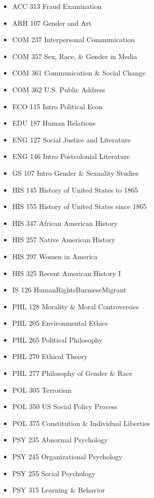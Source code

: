 \documentclass[
  letterpaper,
]{scrbook}
\providecommand{\tightlist}{%
  \setlength{\itemsep}{0pt}\setlength{\parskip}{0pt}}
\begin{document}
\begin{enumerate}
  \begin{itemize}
  \tightlist
  \item
    ACC 313 Fraud Examination
  \item
    ARH 107 Gender and Art
  \item
    COM 237 Interpersonal Communication
  \item
    COM 357 Sex, Race, \& Gender in Media
  \item
    COM 361 Communication \& Social Change
  \item
    COM 362 U.S. Public Address
  \item
    ECO 115 Intro Political Econ
  \item
    EDU 187 Human Relations
  \item
    ENG 127 Social Justice and Literature
  \item
    ENG 146 Intro Postcolonial Literature
  \item
    GS 107 Intro Gender \& Sexuality Studies
  \item
    HIS 145 History of United States to 1865
  \item
    HIS 155 History of United States since 1865
  \item
    HIS 347 African American History
  \item
    HIS 257 Native American History
  \item
    HIS 297 Women in America
  \item
    HIS 325 Recent American History I
  \item
    IS 126 HumanRightsBurmeseMigrant
  \item
    PHL 128 Morality \& Moral Controversies
  \item
    PHL 205 Environmental Ethics
  \item
    PHL 265 Political Philosophy
  \item
    PHL 270 Ethical Theory
  \item
    PHL 277 Philosophy of Gender \& Race
  \item
    POL 305 Terrorism
  \item
    POL 350 US Social Policy Process
  \item
    POL 375 Constitution \& Individual Liberties
  \item
    PSY 235 Abnormal Psychology
  \item
    PSY 245 Organizational Psychology
  \item
    PSY 255 Social Psychology
  \item
    PSY 315 Learning \& Behavior

\end{itemize}
\end{enumerate}
\end{document}
